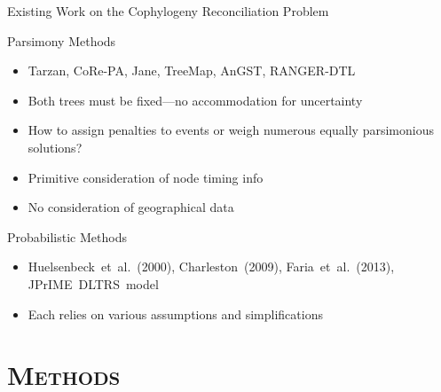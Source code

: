 \documentclass{beamer}
\let\oldsection\section
\renewcommand{\section}[1]{\oldsection{\textsc{#1}}\subsection{}}
\begin{document}
\begin{frame}{Existing Work on the Cophylogeny Reconciliation Problem}

\begin{block}{Parsimony Methods}

\begin{itemize}

\item Tarzan, CoRe-PA, Jane, TreeMap, AnGST, RANGER-DTL \pause

\item Both trees must be fixed---no accommodation for uncertainty \pause

\item How to assign penalties to events or weigh numerous equally parsimonious solutions? \pause

\item Primitive consideration of node timing info \pause

\item No consideration of geographical data \pause

\end{itemize}

\end{block}

\begin{block}{Probabilistic Methods}

\begin{itemize}

\item Huelsenbeck~et~al.~(2000), Charleston~(2009), Faria~et~al.~(2013), JPrIME~DLTRS~model \pause

\item Each relies on various assumptions and simplifications

\end{itemize} 

\end{block}

\end{frame}

\section{Methods}
\end{document}
